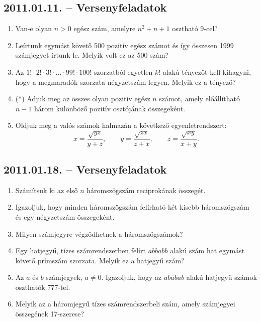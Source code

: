 \subsection*{2011.01.11. -- Versenyfeladatok}
\begin{enumerate}
\item Van-e olyan $n>0$ egész szám, amelyre $n^2+n+1$ osztható 9-cel?
\item Leírtunk egymást követő 500 pozitív egész számot és így összesen 1999 számjegyet írtunk le. Melyik volt ez az 500 szám?
\item Az $1!\cdot 2!\cdot 3!\cdot \ldots \cdot 99!\cdot 100!$ szorzatból egyetlen 
$k!$ alakú tényezőt kell kihagyni, hogy a megmaradók szorzata négyzetszám legyen.
Melyik ez a tényező?
\item ($*$) Adjuk meg az összes olyan pozitív egész $n$ számot, amely előállítható
$n-1$ három különböző pozitív osztójának összegeként.
\item Oldjuk  meg a valós számok halmazán a következő egyenletrendszert:
$$x=\dfrac{\sqrt{yz}}{y+z},\qquad
y=\dfrac{\sqrt{zx}}{z+x},\qquad
z=\dfrac{\sqrt{xy}}{x+y}.
$$
\end{enumerate}

\subsection*{2011.01.18. -- Versenyfeladatok}
\begin{enumerate}
\item Számítsuk ki az első $n$ háromszögszám reciprokának összegét.
\item Igazoljuk, hogy minden háromszögszám felírható két kisebb háromszögszám és egy négyzetszám összegeként.
\item Milyen számjegyre végződhetnek a háromszögszámok?
\item Egy hatjegyű, tízes számrendszerben felírt $\overline{abbabb}$ alakú
szám hat egymást követő prímszám szorzata. Melyik ez a hatjegyű szám?
\item Az $a$ és $b$ számjegyek, $a\ne 0$. Igazoljuk, hogy az $\overline{ababab}$
alakú hatjegyű számok oszthatók 777-tel.
\item Melyik az a háromjegyű tízes számrendszerbeli szám, amely számjegyei összegének 17-szerese?
\end{enumerate}

